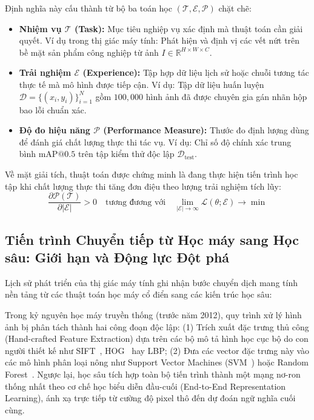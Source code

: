 Định nghĩa này cấu thành từ bộ ba toán học $(\mathcal{T}, \mathcal{E}, \mathcal{P})$ chặt chẽ:
\begin{itemize}
    \item \textbf{Nhiệm vụ $\mathcal{T}$ (Task):} Mục tiêu nghiệp vụ xác định mà thuật toán cần giải quyết. Ví dụ trong thị giác máy tính: Phát hiện và định vị các vết nứt trên bề mặt sản phẩm công nghiệp từ ảnh $I \in \mathbb{R}^{H \times W \times C}$.
    \item \textbf{Trải nghiệm $\mathcal{E}$ (Experience):} Tập hợp dữ liệu lịch sử hoặc chuỗi tương tác thực tế mà mô hình được tiếp cận. Ví dụ: Tập dữ liệu huấn luyện $\mathcal{D} = \{(x_i, y_i)\}_{i=1}^N$ gồm $100,000$ hình ảnh đã được chuyên gia gán nhãn hộp bao lỗi chuẩn xác.
    \item \textbf{Độ đo hiệu năng $\mathcal{P}$ (Performance Measure):} Thước đo định lượng dùng để đánh giá chất lượng thực thi tác vụ. Ví dụ: Chỉ số độ chính xác trung bình $\text{mAP}@0.5$ trên tập kiểm thử độc lập $\mathcal{D}_{\text{test}}$.
\end{itemize}

Về mặt giải tích, thuật toán được chứng minh là đang thực hiện tiến trình học tập khi chất lượng thực thi tăng đơn điệu theo lượng trải nghiệm tích lũy:
\begin{equation}
\frac{\partial \mathcal{P}(\mathcal{T})}{\partial |\mathcal{E}|} > 0 \quad \text{tương đương với} \quad \lim_{|\mathcal{E}| \to \infty} \mathcal{L}(\theta; \mathcal{E}) \to \min
\end{equation}

\subsection{Tiến trình Chuyển tiếp từ Học máy sang Học sâu: Giới hạn và Động lực Đột phá}

Lịch sử phát triển của thị giác máy tính ghi nhận bước chuyển dịch mang tính nền tảng từ các thuật toán học máy cổ điển sang các kiến trúc học sâu:

Trong kỷ nguyên học máy truyền thống (trước năm 2012), quy trình xử lý hình ảnh bị phân tách thành hai công đoạn độc lập: (1) Trích xuất đặc trưng thủ công (Hand-crafted Feature Extraction) dựa trên các bộ mô tả hình học cục bộ do con người thiết kế như SIFT~\citep{lowe2004distinctive}, HOG~\citep{dalal2005histograms} hay LBP; (2) Đưa các vector đặc trưng này vào các mô hình phân loại nông như Support Vector Machines (SVM~\citep{cortes1995support}) hoặc Random Forest~\citep{breiman2001random}. Ngược lại, học sâu tích hợp toàn bộ tiến trình thành một mạng nơ-ron thống nhất theo cơ chế học biểu diễn đầu-cuối (End-to-End Representation Learning), ánh xạ trực tiếp từ cường độ pixel thô đến dự đoán ngữ nghĩa cuối cùng.

